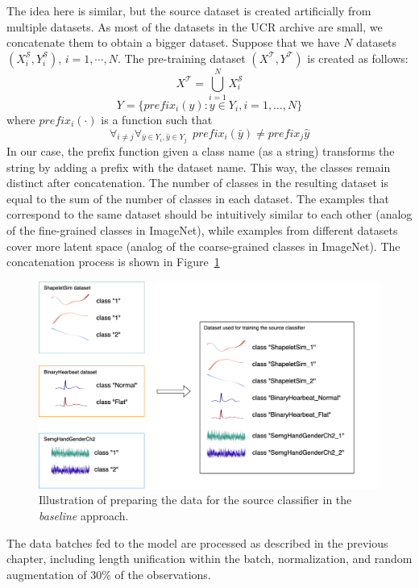 \documentclass[a4paper,11pt,twoside]{report}
\theoremstyle{definition}
\begin{document}
The idea here is similar, but the source dataset is created artificially from multiple datasets. As most of the datasets in the UCR archive are small, we concatenate them to obtain a bigger dataset. Suppose that we have $N$ datasets $(X_i^\mathcal{S}, Y_i^\mathcal{S})$, $i=1, \cdots, N$.
The pre-training dataset $(X^\mathcal{T}, Y^\mathcal{T})$ is created as follows:
$$X^\mathcal{T} = \bigcup_{i=1}^N X_i^\mathcal{S}$$
$$Y = \{prefix_i(y): y \in Y_i, i=1, \dots, N\}$$
where $prefix_i(\cdot)$ is a function such that $$\forall_{i\neq j} \forall_{\bar{y} \in Y_i, \hat{y} \in Y_j} \ \  prefix_i(\bar{y}) \neq prefix_j{\hat{y}}$$
In our case, the prefix function given a class name (as a string) transforms the string by adding a prefix with the dataset name. This way, the classes remain distinct after concatenation. The number of classes in the resulting dataset is equal to the sum of the number of classes in each dataset. The examples that correspond to the same dataset should be intuitively similar to each other (analog of the fine-grained classes in ImageNet), while examples from different datasets cover more latent space (analog of the coarse-grained classes in ImageNet). The concatenation process is shown in Figure~\ref{fig:baseline_dataset}


\FloatBarrier
\begin{figure}[h!]
\centering
\includegraphics[width=17cm]{imgs/baseline.drawio.png}
\caption{Illustration of preparing the data for the source classifier in the \textit{baseline} approach.}
\label{fig:baseline_dataset}
\end{figure}

\FloatBarrier
The data batches fed to the model are processed as described in the previous chapter, including length unification within the batch, normalization, and random augmentation of 30\% of the observations.
\end{document}
